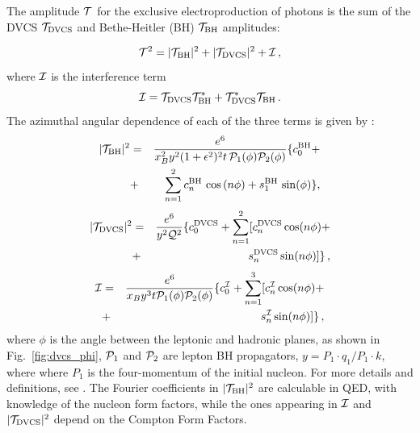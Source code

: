 The amplitude ${\cal T}$ for the exclusive electroproduction of photons is the sum of the DVCS ${\cal T}_{\rm DVCS}$ and Bethe-Heitler (BH) ${\cal T}_{\rm BH}$ amplitudes:

\begin{equation}
{\cal T}^2
= |{\cal T}_{\rm BH}|^2 + |{\cal T}_{\rm DVCS}|^2 + {\cal I}
\, ,
\end{equation}
where ${\cal I}$ is the interference term
\begin{equation}
{\cal I}
= {\cal T}_{\rm DVCS} {\cal T}_{\rm BH}^\ast
+ {\cal T}_{\rm DVCS}^\ast {\cal T}_{\rm BH}
\, .
\end{equation}
The azimuthal angular dependence of each of the three terms is given by \cite{belitski}:
\begin{eqnarray}
\label{Par-BH}
|{\cal T}_{\rm BH}|^2
&=& \frac{e^6}
{x_B^2 y^2 (1 + \epsilon^2)^2 t\, {\cal P}_1 (\phi) {\cal P}_2 (\phi)}
\{
c^{\rm BH}_0 + \nonumber \\
&+&  \sum_{n = 1}^2
c^{\rm BH}_n \, \cos{(n\phi)} + s^{\rm BH}_1 \, \sin(\phi)\},
\end{eqnarray}
\begin{eqnarray}
\label{AmplitudesSquared}
|{\cal T}_{\rm DVCS}|^2
&=& \frac{e^6}{y^2 {\cal Q}^2}\{c^{\rm DVCS}_0 + \sum_{n=1}^2 [c^{\rm DVCS}_n \cos (n\phi) + \nonumber\\
&+& s^{\rm DVCS}_n \sin (n \phi)]\} \, ,
\end{eqnarray}
\begin{eqnarray}
\label{InterferenceTerm}
{\cal I}&=& \frac{e^6}{x_B y^3 t {\cal P}_1 (\phi) {\cal P}_2 (\phi)}\{c_0^{\cal I}+ \sum_{n = 1}^3[c_n^{\cal I} \cos(n \phi) +\nonumber\\
&+&  s_n^{\cal I} \sin(n \phi)]\} \, ,
\end{eqnarray}
where $\phi$ is the angle between the leptonic and hadronic planes, as shown in Fig.~\ref{fig:dvcs_phi}, ${\cal P}_1$ and ${\cal P}_2$ are lepton BH propagators, $y= P_1\cdot q_1/P_1\cdot k$, where where $P_1$ is the four-momentum of the initial nucleon. For more details and definitions, see \cite{belitski}.
The Fourier coefficients in $|{\cal T}_{\rm BH}|^2$ are calculable in QED, with knowledge of the nucleon form factors, while the ones appearing in ${\cal I}$ and $|{\cal T}_{\rm DVCS}|^2$ depend on the Compton Form Factors. 

